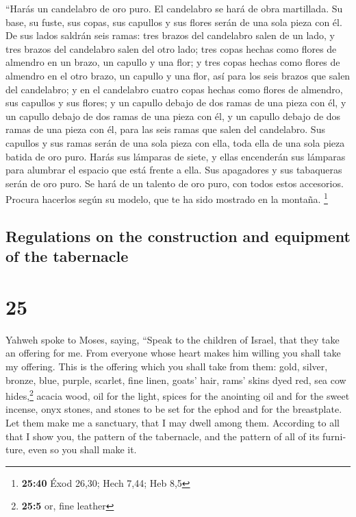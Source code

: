 \begin{paracol}{2}
 ``Harás un candelabro de oro puro. El candelabro se hará
de obra martillada. Su base, su fuste, sus copas, sus capullos y sus
flores serán de una sola pieza con él.  De sus lados
saldrán seis ramas: tres brazos del candelabro salen de un lado, y tres
brazos del candelabro salen del otro lado;  tres copas
hechas como flores de almendro en un brazo, un capullo y una flor; y
tres copas hechas como flores de almendro en el otro brazo, un capullo y
una flor, así para los seis brazos que salen del candelabro;
 y en el candelabro cuatro copas hechas como flores de
almendro, sus capullos y sus flores;  y un capullo debajo
de dos ramas de una pieza con él, y un capullo debajo de dos ramas de
una pieza con él, y un capullo debajo de dos ramas de una pieza con él,
para las seis ramas que salen del candelabro.  Sus
capullos y sus ramas serán de una sola pieza con ella, toda ella de una
sola pieza batida de oro puro.  Harás sus lámparas de
siete, y ellas encenderán sus lámparas para alumbrar el espacio que está
frente a ella.  Sus apagadores y sus tabaqueras serán de
oro puro.  Se hará de un talento de oro puro, con todos
estos accesorios.  Procura hacerlos según su modelo, que
te ha sido mostrado en la montaña. \footnote{\textbf{25:40} Éxod 26,30;
  Hech 7,44; Heb 8,5}

\switchcolumn
\begin{otherlanguage}{english}

\hypertarget{regulations-on-the-construction-and-equipment-of-the-tabernacle}{%
\subsection{Regulations on the construction and equipment of the
tabernacle}\label{regulations-on-the-construction-and-equipment-of-the-tabernacle}}

\hypertarget{section-49}{%
\section{25}\label{section-49}}

 Yahweh spoke to Moses, saying,  ``Speak to
the children of Israel, that they take an offering for me. From everyone
whose heart makes him willing you shall take my offering. 
This is the offering which you shall take from them: gold, silver,
bronze,  blue, purple, scarlet, fine linen, goats' hair,
 rams' skins dyed red, sea cow hides,\footnote{\textbf{25:5}
  or, fine leather} acacia wood,  oil for the light,
spices for the anointing oil and for the sweet incense, 
onyx stones, and stones to be set for the ephod and for the breastplate.
 Let them make me a sanctuary, that I may dwell among
them.  According to all that I show you, the pattern of
the tabernacle, and the pattern of all of its furniture, even so you
shall make it.


\end{otherlanguage}
\end{paracol}
